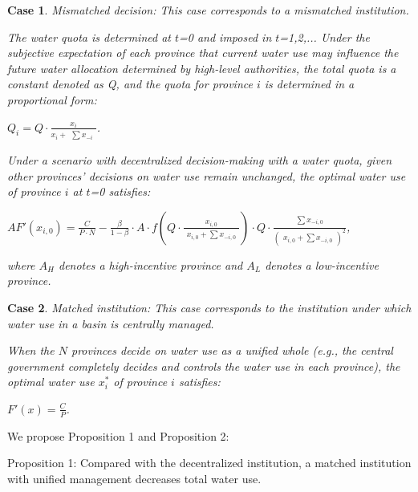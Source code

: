 \documentclass[default, sn-standardnature]{sn-jnl}
\newtheorem{case}{Case}
\begin{document}
 \begin{case} Mismatched decision: This case corresponds to a mismatched institution.

 The water quota is determined at $t$=0 and imposed in $t$=1,2,... Under the subjective expectation of each province that current water use may influence the future water allocation determined by high-level authorities, the total quota is a constant denoted as Q, and the quota for province $i$ is determined in a proportional form:

 $Q_i=Q \cdot \frac{x_i}{x_i + \begin{matrix}\sum{x_{-i}} \end{matrix}}$.

Under a scenario with decentralized decision-making with a water quota, given other provinces' decisions on water use remain unchanged, the optimal water use of province $i$ at $t$=0 satisfies:

$AF'(x_{i,0})=\frac{C}{P \cdot N} - \frac{\beta}{1-\beta} \cdot A \cdot f(Q \cdot \frac{x_{i,0}}{\begin{matrix} x_{i,0} + \sum x_{-i,0} \end{matrix}}) \cdot Q \cdot \frac{\begin{matrix} \sum x_{-i,0} \end{matrix}}{(\begin{matrix} x_{i,0} + \sum x_{-i,0} \end{matrix})^2}$,

where $A_H$ denotes a high-incentive province and $A_L$ denotes a low-incentive province.

 \end{case}


 \begin{case} Matched institution: This case corresponds to the institution under which water use in a basin is centrally managed.

 When the $N$ provinces decide on water use as a unified whole (e.g., the central government completely decides and controls the water use in each province), the optimal water use $x_i^*$ of province $i$ satisfies:

$F'(x)=\frac{C}{P}$.

 \end{case}


We propose Proposition 1 and Proposition 2:

Proposition 1: Compared with the decentralized institution, a matched institution with unified management decreases total water use.
\end{document}
